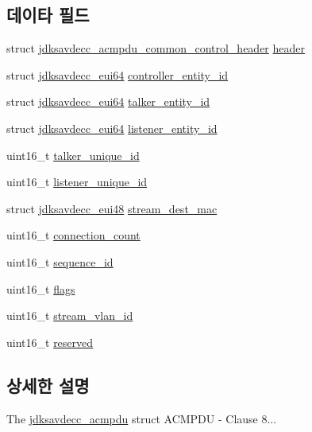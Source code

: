 \subsection*{데이타 필드}
\begin{DoxyCompactItemize}
\item 
struct \hyperlink{structjdksavdecc__acmpdu__common__control__header}{jdksavdecc\+\_\+acmpdu\+\_\+common\+\_\+control\+\_\+header} \hyperlink{structjdksavdecc__acmpdu_a2c237e845db12511d3ddd73770461bed}{header}
\item 
struct \hyperlink{structjdksavdecc__eui64}{jdksavdecc\+\_\+eui64} \hyperlink{structjdksavdecc__acmpdu_affc928ddb4fc62d1d04a775d36e5f2c8}{controller\+\_\+entity\+\_\+id}
\item 
struct \hyperlink{structjdksavdecc__eui64}{jdksavdecc\+\_\+eui64} \hyperlink{structjdksavdecc__acmpdu_a5a263561481c86cc310ff078f7313b6d}{talker\+\_\+entity\+\_\+id}
\item 
struct \hyperlink{structjdksavdecc__eui64}{jdksavdecc\+\_\+eui64} \hyperlink{structjdksavdecc__acmpdu_ae204d36de673d5135ef97cc19a344b37}{listener\+\_\+entity\+\_\+id}
\item 
uint16\+\_\+t \hyperlink{structjdksavdecc__acmpdu_a0358bf4a1f59922974d1f0cb08fd8ef4}{talker\+\_\+unique\+\_\+id}
\item 
uint16\+\_\+t \hyperlink{structjdksavdecc__acmpdu_a13c0b9c45a002c3c35ae4d85a3018c07}{listener\+\_\+unique\+\_\+id}
\item 
struct \hyperlink{structjdksavdecc__eui48}{jdksavdecc\+\_\+eui48} \hyperlink{structjdksavdecc__acmpdu_acb9f6beb748e2b0e9086f809a4b3143d}{stream\+\_\+dest\+\_\+mac}
\item 
uint16\+\_\+t \hyperlink{structjdksavdecc__acmpdu_add60d6d8d5c6d6819002418e6e8404fa}{connection\+\_\+count}
\item 
uint16\+\_\+t \hyperlink{structjdksavdecc__acmpdu_a8f184eb7c16a6d3a501c383ee8ffa200}{sequence\+\_\+id}
\item 
uint16\+\_\+t \hyperlink{structjdksavdecc__acmpdu_a1e87af3c18a2fd36c61faf89949bdc3f}{flags}
\item 
uint16\+\_\+t \hyperlink{structjdksavdecc__acmpdu_a8901fae0712dfce7341cdcbe8b43035c}{stream\+\_\+vlan\+\_\+id}
\item 
uint16\+\_\+t \hyperlink{structjdksavdecc__acmpdu_a5a6ed8c04a3db86066924b1a1bf4dad3}{reserved}
\end{DoxyCompactItemize}


\subsection{상세한 설명}
The \hyperlink{structjdksavdecc__acmpdu}{jdksavdecc\+\_\+acmpdu} struct A\+C\+M\+P\+DU -\/ Clause 8... 

